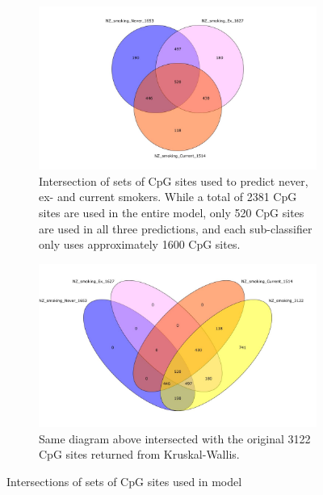 \documentclass{article}
\begin{document}
\begin{figure}[H]
    \centering
    \begin{subfigure}{\textwidth}
        \centering
        \includegraphics[width=\linewidth]{Venn_NZ_3gps.jpg}
        \caption{Intersection of sets of CpG sites used to predict never, ex- and current smokers. While a total of 2381 CpG sites are used in the entire model, only 520 CpG sites are used in all three predictions, and each sub-classifier only uses approximately 1600 CpG sites.}
    \end{subfigure}
    \begin{subfigure}{\textwidth}
        \centering
        \includegraphics[width=\linewidth]{Venn_NZ_3gps_KWlist.jpg}
        \caption{Same diagram above intersected with the original 3122 CpG sites returned from Kruskal-Wallis.}
    \end{subfigure}
    \caption{Intersections of sets of CpG sites used in model}
    \label{fig:model-intersect}
\end{figure}
\end{document}
